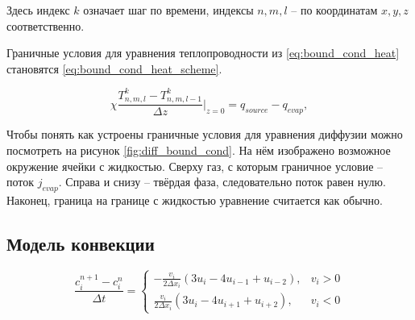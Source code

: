 \noindent 
Здесь индекс $k$ означает шаг по времени, индексы $n, m, l$ -- по координатам $x, y, z$ соответственно. 

Граничные условия для уравнения теплопроводности из \ref{eq:bound_cond_heat} становятся \ref{eq:bound_cond_heat_scheme}.

\begin{equation}
    \label{eq:bound_cond_heat_scheme}
    \chi \frac{T^k_{n,m,l} - T^k_{n,m,l-1}}{\Delta z}  \big|_{z=0} = q_{source} - q_{evap},
\end{equation}

Чтобы понять как устроены граничные условия для уравнения диффузии можно посмотреть на рисунок \ref{fig:diff_bound_cond}. На нём изображено возможное окружение ячейки с жидкостью. Сверху газ, с которым граничное условие -- поток $j_{evap}$. Справа и снизу -- твёрдая фаза, 
следовательно поток равен нулю. Наконец, граница на границе с жидкостью уравнение считается как обычно.





\subsection{Модель конвекции}

\begin{equation}
    \label{eq:sec-upwind}
    \frac{c^{n+1}_{i} - c^{n}_{i}}{\Delta t} =
    \begin{cases}
         -\frac{v_i}{2\Delta x_i}(3u_i-4u_{i-1}+u_{i-2}), &v_i > 0 \\
         \frac{v_i}{2\Delta x_i}(3u_i-4u_{i+1}+u_{i+2}), &v_i < 0 
    \end{cases}
\end{equation}

\clearpage
